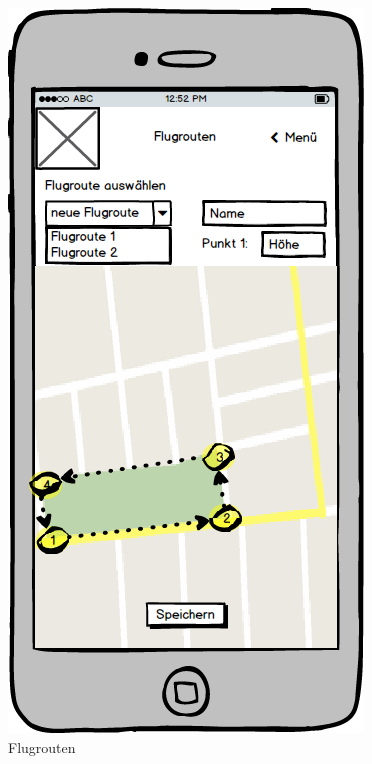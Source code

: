 \begin{figure}
	\centering
	\includegraphics[scale=0.8]{images/Flugrouten}
	\caption{Flugrouten}
\end{figure}
\newpage

